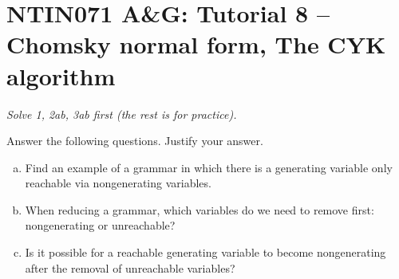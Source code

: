 \documentclass[a4paper,12pt]{amsart}
\begin{document}
\thispagestyle{empty}

\section*{NTIN071 A\&G: Tutorial 8 -- Chomsky normal form, The CYK algorithm}


\medskip

\noindent\emph{Solve 1, 2ab, 3ab first (the rest is for practice).}

\medskip\begin{problem}
    
    Answer the following questions. Justify your answer.
    
    \begin{enumerate}[(a)]\setlength{\itemsep}{6pt}
        \item Find an example of a grammar in which there is a generating variable only reachable via nongenerating variables.
        \item When reducing a grammar, which variables do we need to remove first: nongenerating or unreachable?
        \item Is it possible for a reachable generating variable to become nongenerating after the removal of unreachable variables?
    \end{enumerate}

\end{problem}
    
\end{document}
